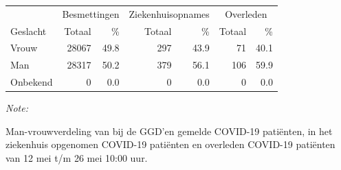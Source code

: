 \documentclass[
  english,
  man,floatsintext]{apa6}
\begin{document}
\begin{table}
\centering\begingroup\fontsize{11}{13}\selectfont

\begin{threeparttable}
\begin{tabular}{lrrrrrr}
\toprule
\multicolumn{1}{c}{ } & \multicolumn{2}{c}{Besmettingen} & \multicolumn{2}{c}{Ziekenhuisopnames} & \multicolumn{2}{c}{Overleden} \\
\cmidrule(l{3pt}r{3pt}){2-3} \cmidrule(l{3pt}r{3pt}){4-5} \cmidrule(l{3pt}r{3pt}){6-7}
Geslacht & Totaal & \% & Totaal & \% & Totaal & \%\\
\midrule
Vrouw & 28067 & 49.8 & 297 & 43.9 & 71 & 40.1\\
Man & 28317 & 50.2 & 379 & 56.1 & 106 & 59.9\\
Onbekend & 0 & 0.0 & 0 & 0.0 & 0 & 0.0\\
\bottomrule
\end{tabular}
\begin{tablenotes}
\item \textit{Note: } 
\item Man-vrouwverdeling van bij de GGD’en gemelde COVID-19 patiënten, in het ziekenhuis opgenomen COVID-19 patiënten en overleden COVID-19 patiënten van 12 mei t/m 26 mei 10:00 uur.
\end{tablenotes}
\end{threeparttable}
\endgroup{}
\end{table}
\newpage
\end{document}
